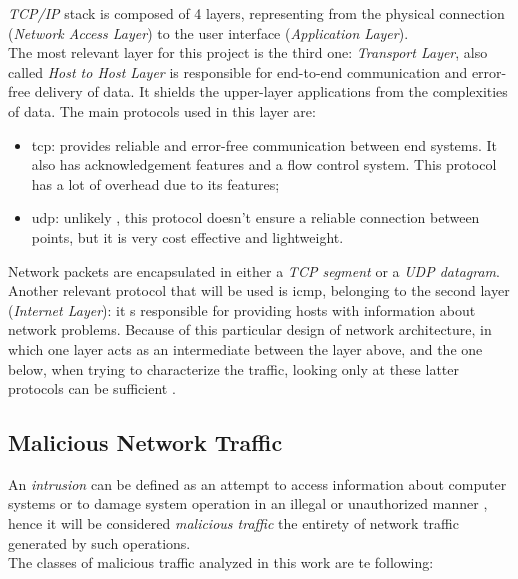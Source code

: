 \textit{TCP/IP} stack is composed of 4 layers, representing from the physical connection (\textit{Network Access Layer}) to the user interface (\textit{Application Layer}). \\ The most relevant layer for this project is the third one: \textit{Transport Layer}, also called \textit{Host to Host Layer} is responsible for end-to-end communication and error-free delivery of data. It shields the upper-layer applications from the complexities of data. The main protocols used in this layer are:

\begin{itemize}
    \item[\faCaretRight] \gls{tcp}: provides reliable and error-free communication between end systems. It also has acknowledgement features and a flow control system. This protocol has a lot of overhead due to its features;
    \item[\faCaretRight] \gls{udp}: unlikely , this protocol doesn't ensure a reliable connection between points, but it is very cost effective and lightweight.
\end{itemize}
Network packets are encapsulated in either a \textit{TCP segment} or a \textit{UDP datagram}. Another relevant protocol that will be used is \gls{icmp}, belonging to the second layer (\textit{Internet Layer}): it s responsible for providing hosts with information about network problems. Because of this particular design of network architecture, in which one layer acts as an intermediate between the layer above, and the one below, when trying to characterize the traffic, looking only at these latter protocols can be sufficient \cite{Iglesias2015}.


\subsection{Malicious Network Traffic}
\label{subsec:malicious-traffic}

An \textit{intrusion} can be defined as an attempt to access information about computer systems or to damage system operation in an illegal or unauthorized manner \cite{Liu2019}, hence it will be considered \textit{malicious traffic} the entirety of network traffic generated by such operations. \\
The classes of malicious traffic analyzed in this work are te following:

